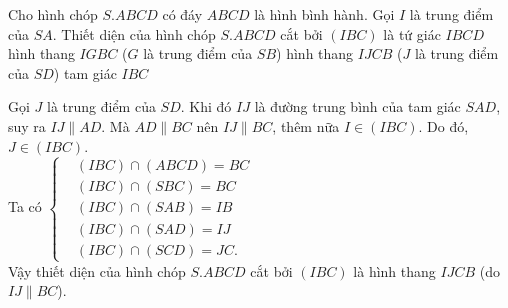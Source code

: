 \begin{ex}%
Cho hình chóp $S.ABCD$ có đáy $ABCD$ là hình bình hành. Gọi $I$ là trung điểm của $SA$. Thiết diện của hình chóp $S.ABCD$ cắt bởi $(IBC)$ là
\choice
{tứ giác $IBCD$}
{hình thang $IGBC$ ($G$ là trung điểm của $SB$)}
{\True hình thang $IJCB$ ($J$ là trung điểm của $SD$)}
{tam giác $IBC$}
\loigiai
{
\immini
{
Gọi $J$ là trung điểm của $SD$. Khi đó $IJ$ là đường trung bình của tam giác $SAD$, suy ra $IJ\parallel AD$. Mà $AD\parallel BC$ nên $IJ\parallel BC$, thêm nữa $I\in (IBC)$. Do đó, $J\in (IBC)$.\\
Ta có $\left\{\begin{aligned}&(IBC)\cap (ABCD)=BC \\&(IBC)\cap (SBC)=BC \\&(IBC)\cap (SAB)=IB\\&(IBC)\cap (SAD)=IJ \\&(IBC)\cap (SCD)=JC.\end{aligned}\right.$\\
Vậy thiết diện của hình chóp $S.ABCD$ cắt bởi $(IBC)$ là hình thang $IJCB$ (do $IJ\parallel BC$).
}
{
}
}
\end{ex}

